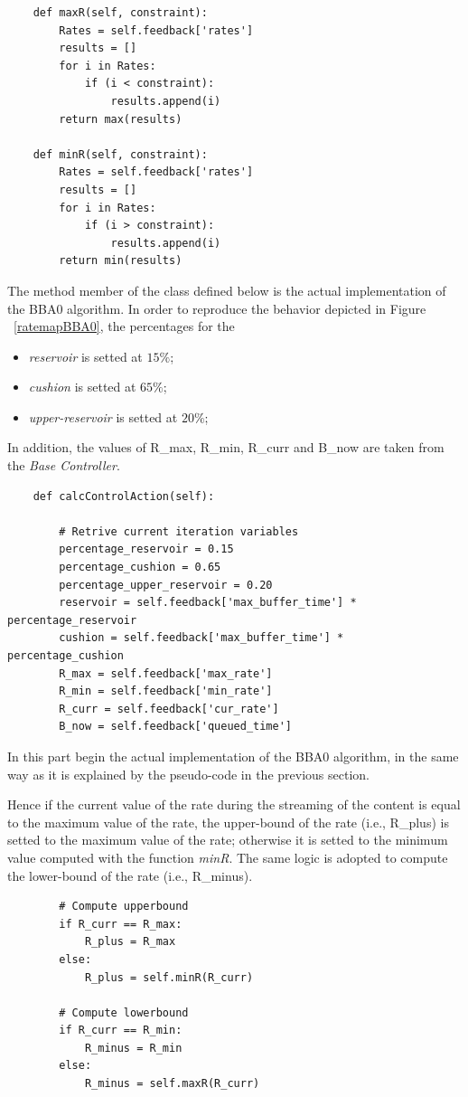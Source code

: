 \documentclass[a4paper]{report}
\begin{document}
\begin{Verbatim}
    def maxR(self, constraint):
        Rates = self.feedback['rates']
        results = []
        for i in Rates:
            if (i < constraint):
                results.append(i)
        return max(results)

    def minR(self, constraint):
        Rates = self.feedback['rates']
        results = []
        for i in Rates:
            if (i > constraint):
                results.append(i)
        return min(results)
\end{Verbatim}

The method member of the class defined below is the actual implementation of the BBA0 algorithm. In order to reproduce the behavior depicted in Figure ~\ref{ratemapBBA0}, the percentages for the
\begin{itemize}
\item \textit{reservoir} is setted at $15\%$;
\item \textit{cushion} is setted at $65\%$;
\item \textit{upper-reservoir} is setted at $20\%$;
\end{itemize}
In addition, the values of R\_max, R\_min, R\_curr and B\_now are taken from the \textit{Base Controller}.
\begin{Verbatim}
    def calcControlAction(self):

        # Retrive current iteration variables
        percentage_reservoir = 0.15
        percentage_cushion = 0.65
        percentage_upper_reservoir = 0.20
        reservoir = self.feedback['max_buffer_time'] * percentage_reservoir
        cushion = self.feedback['max_buffer_time'] * percentage_cushion
        R_max = self.feedback['max_rate']
        R_min = self.feedback['min_rate']
        R_curr = self.feedback['cur_rate']
        B_now = self.feedback['queued_time']
\end{Verbatim}

In this part begin the actual implementation of the BBA0 algorithm, in the same way as it is explained by the pseudo-code in the previous section.

Hence if the current value of the rate during the streaming of the content is equal to the maximum value of the rate, the upper-bound of the rate (i.e., R\_plus) is setted to the maximum value of the rate; otherwise it is setted to the minimum value computed with the function \textit{minR}.
The same logic is adopted to compute the lower-bound of the rate (i.e., R\_minus).
\begin{Verbatim}
        # Compute upperbound
        if R_curr == R_max:
            R_plus = R_max
        else:
            R_plus = self.minR(R_curr)

        # Compute lowerbound
        if R_curr == R_min:
            R_minus = R_min
        else:
            R_minus = self.maxR(R_curr)
\end{Verbatim}
\end{document}

